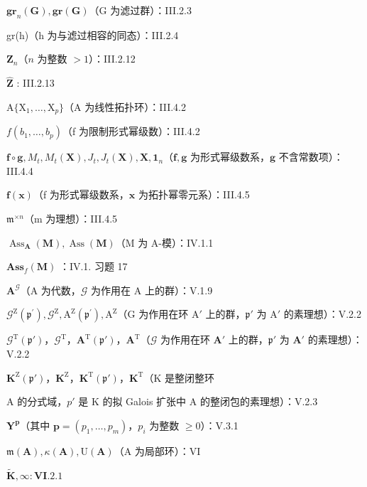 \(\mathbf{gr}_n(\mathbf{G}), \mathbf{gr}(\mathbf{G})\)（G 为滤过群）：III.2.3

gr(h)（h 为与滤过相容的同态）：III.2.4

\(\mathbf{Z}_n\)（\(n\) 为整数 \(>1\)）：III.2.12

\(\hat{\mathbf{Z}}\) : III.2.13

\(\mathrm{A}\{\mathrm{X}_1,\dots ,\mathrm{X}_p\}\)（A 为线性拓扑环）：III.4.2

\(f(b_{1},\ldots ,b_{p})\)（f 为限制形式幂级数）：III.4.2

\(\mathbf{f} \circ \mathbf{g}, M_{t}, M_{t}(\mathbf{X}), J_{t}, J_{t}(\mathbf{X}), \mathbf{X}, \mathbf{1}_{n}\)（\(\mathbf{f}, \mathbf{g}\) 为形式幂级数系，\(\mathbf{g}\) 不含常数项）：III.4.4

\(\mathbf{f}(\mathbf{x})\)（f 为形式幂级数系，\(\mathbf{x}\) 为拓扑幂零元系）：III.4.5

\(\mathfrak{m}^{\times n}\)（m 为理想）：III.4.5

\(\operatorname{Ass}_{\mathbf{A}}(\mathbf{M}), \operatorname{Ass}(\mathbf{M})\)（M 为 A-模）：IV.1.1

\(\mathbf{Ass}_f(\mathbf{M})\) ：IV.1. 习题 17

\(\mathbf{A}^{\mathcal{G}}\)（A 为代数，\(\mathcal{G}\) 为作用在 A 上的群）：V.1.9

\(\mathcal{G}^{\mathrm{Z}}(\mathfrak{p}^{\prime}), \mathcal{G}^{\mathrm{Z}}, \mathrm{A}^{\mathrm{Z}}(\mathfrak{p}^{\prime}), \mathrm{A}^{\mathrm{Z}}\)（G 为作用在环 \(\mathrm{A}'\) 上的群，\(\mathfrak{p}'\) 为 \(\mathrm{A}'\) 的素理想）：V.2.2

\(\mathcal{G}^{\mathrm{T}}(\mathfrak{p}')\)，\(\mathcal{G}^{\mathrm{T}}\)，\(\mathbf{A}^{\mathrm{T}}(\mathfrak{p}')\)，\(\mathbf{A}^{\mathrm{T}}\)（\(\mathcal{G}\) 为作用在环 \(\mathbf{A}'\) 上的群，\(\mathfrak{p}'\) 为 \(\mathbf{A}'\) 的素理想）：V.2.2

\(\mathbf{K}^{\mathrm{Z}}(\mathfrak{p}')\)，\(\mathbf{K}^{\mathrm{Z}}\)，\(\mathbf{K}^{\mathrm{T}}(\mathfrak{p}')\)，\(\mathbf{K}^{\mathrm{T}}\)（K 是整闭整环

A 的分式域，\(p'\) 是 K 的拟 Galois 扩张中 A 的整闭包的素理想）：V.2.3

\(\mathbf{Y}^{\mathbf{p}}\)（其中 \(\mathbf{p} = (p_1, \ldots, p_m)\)，\(p_i\) 为整数 \(\geqslant 0\)）：V.3.1

\(\mathfrak{m}(\mathbf{A}), \kappa(\mathbf{A}), \mathrm{U}(\mathbf{A})\)（A 为局部环）：VI

\(\tilde{\mathbf{K}},\infty :\mathbf{VI}.2.1\)

